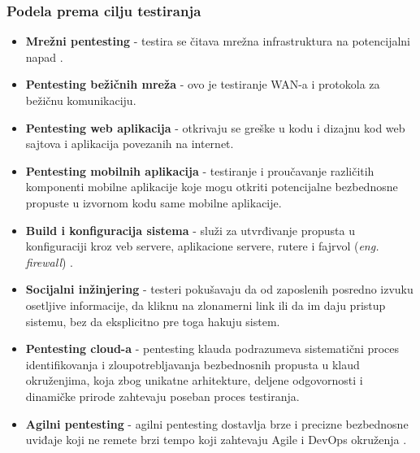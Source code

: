 \documentclass[a4paper,12pt]{article}
\begin{document}
\subsubsection{Podela prema cilju testiranja}
\begin{itemize}
  \item \textbf{Mrežni pentesting} - testira se čitava mrežna infrastruktura na potencijalni napad \cite{ibm_offensive_security}. \\
  \item \textbf{Pentesting bežičnih mreža} - ovo je testiranje WAN-a i protokola za bežičnu komunikaciju. \\
  \item \textbf{Pentesting web aplikacija} - otkrivaju se greške u kodu i dizajnu kod web sajtova i aplikacija povezanih na internet. \\ 
  \item \textbf{Pentesting mobilnih aplikacija} - testiranje i proučavanje različitih komponenti mobilne aplikacije koje mogu otkriti potencijalne bezbednosne propuste u izvornom kodu same mobilne aplikacije.
   \item \textbf{Build i konfiguracija sistema} - služi za utvrđivanje propusta u konfiguraciji kroz veb servere, aplikacione servere, rutere i fajrvol (\textit{eng. firewall}) \cite{firewall}. \\
  \item \textbf{Socijalni inžinjering} - testeri pokušavaju da od zaposlenih posredno izvuku osetljive informacije, da kliknu na zlonamerni link ili da im daju pristup sistemu, bez da eksplicitno pre toga hakuju sistem. \\
  \item \textbf{Pentesting cloud-a} - pentesting klauda podrazumeva sistematični proces identifikovanja i zloupotrebljavanja bezbednosnih propusta u klaud okruženjima, koja zbog unikatne arhitekture, deljene odgovornosti i dinamičke prirode zahtevaju poseban proces testiranja. \\
  \item \textbf{Agilni pentesting} - agilni pentesting dostavlja brze i precizne bezbednosne uviđaje koji ne remete brzi tempo koji zahtevaju Agile i DevOps okruženja \cite{types-of-pentesting}. \\
\end{itemize}
\end{document}
